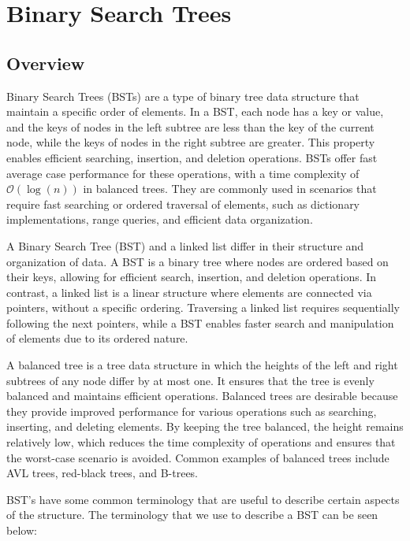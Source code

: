 \section*{Binary Search Trees}

\subsection*{Overview}

Binary Search Trees (BSTs) are a type of binary tree data structure that maintain a specific order of elements. In a BST, each node has a key or value, and the keys of nodes in the left subtree are 
less than the key of the current node, while the keys of nodes in the right subtree are greater. This property enables efficient searching, insertion, and deletion operations. BSTs offer fast average 
case performance for these operations, with a time complexity of $\mathcal{O}(\log{(n)})$ in balanced trees. They are commonly used in scenarios that require fast searching or ordered traversal of elements, 
such as dictionary implementations, range queries, and efficient data organization.

A Binary Search Tree (BST) and a linked list differ in their structure and organization of data. A BST is a binary tree where nodes are ordered based on their keys, allowing for efficient search, insertion, 
and deletion operations. In contrast, a linked list is a linear structure where elements are connected via pointers, without a specific ordering. Traversing a linked list requires sequentially following the 
next pointers, while a BST enables faster search and manipulation of elements due to its ordered nature.

A balanced tree is a tree data structure in which the heights of the left and right subtrees of any node differ by at most one. It ensures that the tree is evenly balanced and maintains efficient operations. 
Balanced trees are desirable because they provide improved performance for various operations such as searching, inserting, and deleting elements. By keeping the tree balanced, the height remains relatively 
low, which reduces the time complexity of operations and ensures that the worst-case scenario is avoided. Common examples of balanced trees include AVL trees, red-black trees, and B-trees.

BST's have some common terminology that are useful to describe certain aspects of the structure. The terminology that we use to describe a BST can be seen below:

